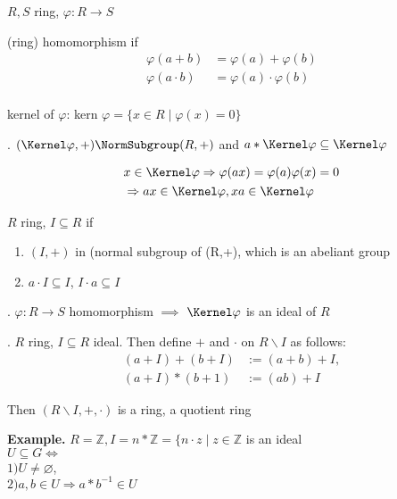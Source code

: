 \begin{definition}
  $R,S$ ring, $\varphi : R \rightarrow S$

  (ring) homomorphism if 
  \begin{align*}
    \varphi(a+b) &= \varphi(a) + \varphi(b)\\
    \varphi(a \cdot b) &= \varphi(a) \cdot \varphi(b)\\
  \end{align*}

  kernel of $\varphi$: kern $\varphi = \{ x \in R \mid \varphi(x) = 0\}$
\end{definition}

\Theorem.
$(\Kernel \varphi, +) \NormSubgroup (R, +)$
and 
$a * \Kernel \varphi \subseteq \Kernel \varphi$

\begin{align*}
  &x \in \Kernel \varphi \Rightarrow \varphi(ax) = \varphi(a) \varphi(x) = 0 \\
  & \Rightarrow a x \in \Kernel \varphi, x a \in \Kernel \varphi
\end{align*}

\begin{definition}
  $R$ ring, $I \subseteq R$  if
  \begin{enumerate}
    \item $(I, +)$ in (normal subgroup of (R,+), which is an abeliant group
    \item $a \cdot I \subseteq I$, $I \cdot a \subseteq I$
  \end{enumerate}
\end{definition}

\Remark.
$\varphi: R \rightarrow S$ homomorphism $\implies$ $\Kernel \varphi$ is an ideal of $R$

\Theorem. 
$R$ ring, $ I \subseteq R$ ideal. Then define $+$ and $\cdot$ on $R\backslash I$ as follows:
\begin{align*}
  (a+I) + (b+I) &:= (a+b)+I, \\
  (a+I)*(b+1) &:= (ab) + I
\end{align*}

Then $(R\backslash I, +, \cdot)$ is a ring, a quotient ring

\textbf{Example.}
$R = \mathbb{Z}, I = n*\mathbb{Z} = \{n \cdot z \mid z \in \mathbb{Z}$ is an ideal \\
$U \subseteq G \Leftrightarrow$ \\
  $1) U \neq \varnothing$, \\
  $2) a,b \in U \Rightarrow a*b^{-1} \in U$

